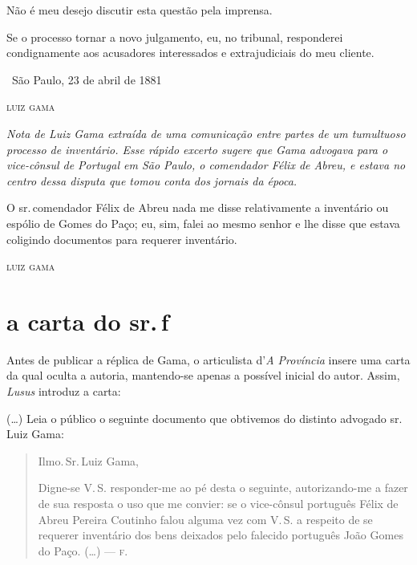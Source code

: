 {Não é meu desejo discutir esta questão pela imprensa.

Se o processo tornar a novo julgamento, eu, no tribunal, responderei
condignamente aos acusadores interessados e extrajudiciais do meu
cliente.

\medskip

\hfill\ São Paulo, 23 de abril de 1881

\hfill\textsc{luiz gama}


\begin{resumo}
\emph{Nota de Luiz Gama extraída de uma comunicação entre partes de um
tumultuoso processo de inventário. Esse rápido excerto sugere que Gama
advogava para o vice-cônsul de Portugal em São Paulo, o comendador Félix
de Abreu, e estava no centro dessa disputa que tomou conta dos jornais
da época.}
\end{resumo}

O sr.\,comendador Félix de Abreu nada me disse relativamente a inventário
ou espólio de Gomes do Paço; eu, sim, falei ao mesmo senhor e lhe disse
que estava coligindo documentos para requerer inventário.

\medskip

\hfill\textsc{luiz gama}

\noindent\dotfill

\section{a carta do sr.\,f}

\begin{resumo}
Antes de publicar a réplica de Gama, o
  articulista d'\emph{A Província} insere uma carta da qual
  oculta a autoria, mantendo-se apenas a possível inicial do autor.
  Assim, \emph{Lusus} introduz a carta: 
\end{resumo}


(\ldots{}) Leia o público o seguinte
documento que obtivemos do distinto advogado sr.\,Luiz Gama:

\begin{quote}
Ilmo.\,Sr.\,Luiz Gama,

  Digne-se V.\,S. responder-me ao pé desta o seguinte, autorizando-me a
  fazer de sua resposta o uso que me convier: se o vice-cônsul português
  Félix de Abreu Pereira Coutinho falou alguma vez com V.\,S. a respeito
  de se requerer inventário dos bens deixados pelo falecido português
  João Gomes do Paço. (\ldots{}) \quad --- \textsc{f}.
\end{quote}


}
